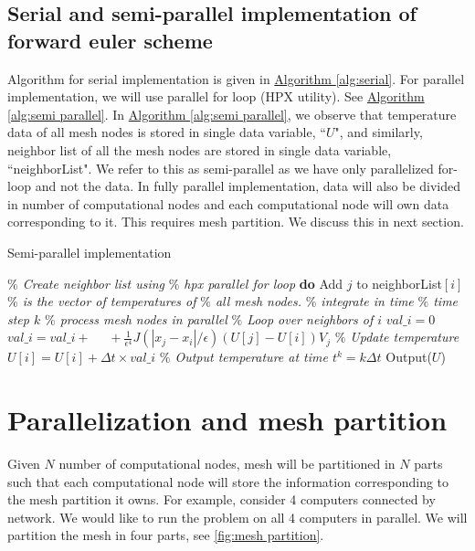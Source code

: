 \documentclass[11pt,twocolumn]{amsart}
\theoremstyle{definition}
\theoremstyle{definition}
\numberwithin{equation}{section}
\numberwithin{equation}{section}
\newcommand{\sref}[2]{\hyperref[#2]{#1 \ref*{#2}}}
\begin{document}
\subsection{Serial and semi-parallel implementation of forward euler scheme}
Algorithm for  serial implementation is given in \sref{Algorithm}{alg:serial}. For parallel implementation, we will use parallel for loop (HPX utility). See \sref{Algorithm}{alg:semi parallel}. In \sref{Algorithm}{alg:semi parallel}, we observe that temperature data of all mesh nodes is stored in single data variable, ``$U$", and similarly, neighbor list of all the mesh nodes are stored in single data variable, ``neighborList". We refer to this as semi-parallel as we have only parallelized for-loop and not the data. In fully parallel implementation, data will also be divided in number of computational nodes and each computational node will own data corresponding to it. This requires mesh partition. We discuss this in next section. 

\begin{algorithm}[ht]
	\caption{Semi-parallel implementation}
	\label{alg:semi parallel}
	\begin{algorithmic}[1]
		\STATE \textcolor{mygray}{\it $\%$ Create neighbor list using }
		\STATE \textcolor{mygray}{\it $\%$ hpx parallel for loop}
		 \textbf{do}
				\STATE Add $j$ to neighborList$[i]$
			\ENDIF
		\EndHloop
		\STATE
		\STATE \textcolor{mygray}{\it $\%$ is the vector of temperatures of}
		\STATE \textcolor{mygray}{\it $\%$ all mesh nodes. }
		\STATE
		\STATE \textcolor{mygray}{\it $\%$ integrate in time}
			\STATE \textcolor{mygray}{\it $\%$ time step $k$}
			\STATE \textcolor{mygray}{\it $\%$ process mesh nodes in parallel}
				\STATE  \textcolor{mygray}{\it $\%$ Loop over neighbors of $i$}
				\STATE $val\_i = 0$
					\STATE $val\_i = val\_i + $
					\STATE $\quad +  \frac{1}{\epsilon^4} J(|x_j - x_i|/\epsilon) (U[j] - U[i])V_j$
				\ENDFOR
				\STATE \textcolor{mygray}{\it $\%$ Update temperature}
				\STATE $U[i] = U[i] + \Delta t \times val\_i$
			\EndHloop	
			\STATE \textcolor{mygray}{\it $\%$ Output temperature at time $t^k = k\Delta t$}
			\STATE Output($U$)
		\ENDFOR
	\end{algorithmic}
\end{algorithm}

\section{Parallelization and mesh partition}
Given $N$ number of computational nodes, mesh will be partitioned in $N$ parts such that each computational node will store the information corresponding to the mesh partition it owns. For example, consider 4 computers connected by network. We would like to run the problem on all 4 computers in parallel. We will partition the mesh in four parts, see \autoref{fig:mesh partition}.
\end{document}

